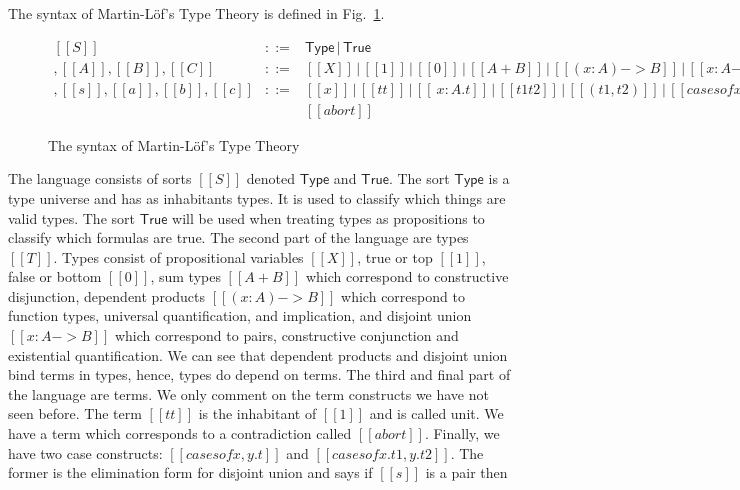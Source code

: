 The syntax of Martin-L\"of's Type Theory is defined in
Fig.~\ref{fig:lof_syntax}.
\begin{figure}
  \begin{center}
    \begin{math}
      \begin{array}{lll}
        [[S]] & ::= & \mathsf{Type}\,|\,\mathsf{True}\\
        [[T]], [[A]], [[B]], [[C]]        & ::= & [[X]]\,|\,[[1]]\,|\,[[0]]\,|\,[[A + B]]\,|\,[[( x : A ) -> B]]\,|\,[[{ x : A } -> B]]\\
        [[t]], [[s]], [[a]], [[b]], [[c]] & ::= &
        [[x]]\,|\,[[tt]]\,|\,[[\ x : A . t]]\,|\,[[t1 t2]]\,|\,[[( t1
        , t2 )]]\,|\,[[case s of x , y . t]]\,|\,[[case s of x . t1 ,
        y . t2]]\,|\,\\& & [[abort]]
      \end{array}
    \end{math}
  \end{center}
  \caption{The syntax of Martin-L\"of's Type Theory}
  \label{fig:lof_syntax}
\end{figure}
The language consists of sorts $[[S]]$ denoted $\mathsf{Type}$ and
$\mathsf{True}$. The sort $\mathsf{Type}$ is a type universe and has
as inhabitants types.  It is used to classify which things are valid
types.  The sort $\mathsf{True}$ will be used when treating
types as propositions to classify which formulas are true. The second
part of the language are types $[[T]]$.  Types consist of
propositional variables $[[X]]$, true or top $[[1]]$, false or bottom
$[[0]]$, sum types $[[A + B]]$ which correspond to constructive
disjunction, dependent products $[[(x : A) -> B]]$ which correspond to
function types, universal quantification, and implication, and
disjoint union $[[{ x : A} -> B]]$ which correspond to
pairs, constructive conjunction and existential quantification.  We can see
that dependent products and disjoint union bind terms in types, hence,
types do depend on terms.  The third and final part of the language
are terms.  We only comment on the term constructs we have not seen
before.  The term $[[tt]]$ is the inhabitant of $[[1]]$ and is called
unit.  We have a term which corresponds to a contradiction called
$[[abort]]$. Finally, we have two case constructs: $[[case s of
    x,y.t]]$ and $[[case s of x.t1,y.t2]]$.  The former is the
elimination form for disjoint union and says if $[[s]]$ is a pair then
